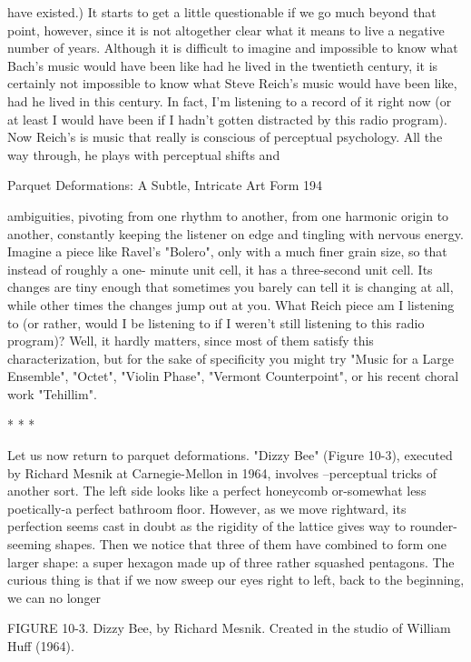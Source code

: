 have existed.) It starts to get a little questionable if we go much beyond that point,
however, since it is not altogether clear what it means to live a negative number of years.
        Although it is difficult to imagine and impossible to know what Bach's music
would have been like had he lived in the twentieth century, it is certainly not impossible
to know what Steve Reich's music would have been like, had he lived in this century. In
fact, I'm listening to a record of it right now (or at least I would have been if I hadn't
gotten distracted by this radio program). Now Reich's is music that really is conscious of
perceptual psychology. All the way through, he plays with perceptual shifts and




Parquet Deformations: A Subtle, Intricate Art Form                                       194

ambiguities, pivoting from one rhythm to another, from one harmonic origin to another,
constantly keeping the listener on edge and tingling with nervous energy. Imagine a piece
like Ravel's "Bolero", only with a much finer grain size, so that instead of roughly a one-
minute unit cell, it has a three-second unit cell. Its changes are tiny enough that
sometimes you barely can tell it is changing at all, while other times the changes jump
out at you. What Reich piece am I listening to (or rather, would I be listening to if I
weren't still listening to this radio program)? Well, it hardly matters, since most of them
satisfy this characterization, but for the sake of specificity you might try "Music for a
Large Ensemble", "Octet", "Violin Phase", "Vermont Counterpoint", or his recent choral
work "Tehillim".

                                         *   *   *

        Let us now return to parquet deformations. "Dizzy Bee" (Figure 10-3), executed
by Richard Mesnik at Carnegie-Mellon in 1964, involves --perceptual tricks of another
sort. The left side looks like a perfect honeycomb or-somewhat less poetically-a perfect
bathroom floor. However, as we move rightward, its perfection seems cast in doubt as the
rigidity of the lattice gives way to rounder-seeming shapes. Then we notice that three of
them have combined to form one larger shape: a super hexagon made up of three rather
squashed pentagons. The curious thing is that if we now sweep our eyes right to left, back
to the beginning, we can no longer

FIGURE 10-3. Dizzy Bee, by Richard Mesnik. Created in the studio of William Huff
(1964).




